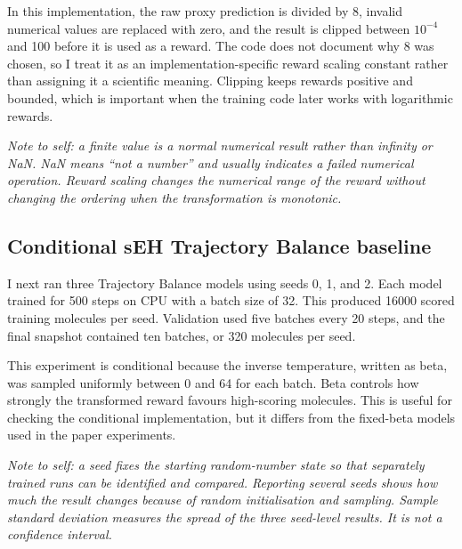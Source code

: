 \documentclass{article}
\begin{document}
In this implementation, the raw proxy prediction is divided by 8, invalid numerical values are replaced with zero, and the result is clipped between \(10^{-4}\) and 100 before it is used as a reward. The code does not document why 8 was chosen, so I treat it as an implementation-specific reward scaling constant rather than assigning it a scientific meaning. Clipping keeps rewards positive and bounded, which is important when the training code later works with logarithmic rewards.

\textit{Note to self: a finite value is a normal numerical result rather than infinity or NaN. NaN means ``not a number'' and usually indicates a failed numerical operation. Reward scaling changes the numerical range of the reward without changing the ordering when the transformation is monotonic.}

\subsection{Conditional sEH Trajectory Balance baseline}

I next ran three Trajectory Balance models using seeds 0, 1, and 2. Each model trained for 500 steps on CPU with a batch size of 32. This produced 16000 scored training molecules per seed. Validation used five batches every 20 steps, and the final snapshot contained ten batches, or 320 molecules per seed.

This experiment is conditional because the inverse temperature, written as beta, was sampled uniformly between 0 and 64 for each batch. Beta controls how strongly the transformed reward favours high-scoring molecules. This is useful for checking the conditional implementation, but it differs from the fixed-beta models used in the paper experiments.

\textit{Note to self: a seed fixes the starting random-number state so that separately trained runs can be identified and compared. Reporting several seeds shows how much the result changes because of random initialisation and sampling. Sample standard deviation measures the spread of the three seed-level results. It is not a confidence interval.}
\end{document}
